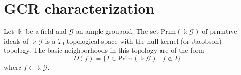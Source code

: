 \documentclass[11pt,reqno]{amsart}
\theoremstyle{plain}
\newtheorem{cor}[thm]{Corollary}
{\theoremstyle{definition}
\newtheorem{dfn}[thm]{Definition}}
{\theoremstyle{remark}
\newtheorem{ex}[thm]{Example}}
{\theoremstyle{remark}
\newtheorem*{ex*}{Example}}
{\theoremstyle{definition}
\newtheorem{note}[thm]{Note}}
{\theoremstyle{remark}
\newtheorem{remark}[thm]{Remark}}
\numberwithin{equation}{section}
\newcommand{\prim}{\mathrm{Prim}}
\newcommand{\G}[0]{\mathscr{G}}
\begin{document}




\section{GCR characterization}\label{sec:GCRcharacterization}

Let $\Bbbk$ be a field and $\mathscr G$ an ample groupoid.  The set $\prim(\Bbbk \mathscr G)$ of primitive ideals of $\Bbbk \mathscr G$ is a $T_0$ topological space with the hull-kernel (or Jacobson) topology.  The basic neighborhoods in this topology are of the form \[D(f)=\{I\in \prim(\Bbbk \mathscr G)\mid f\notin I\}\] where $f\in \Bbbk\mathscr G$.
\end{document}
